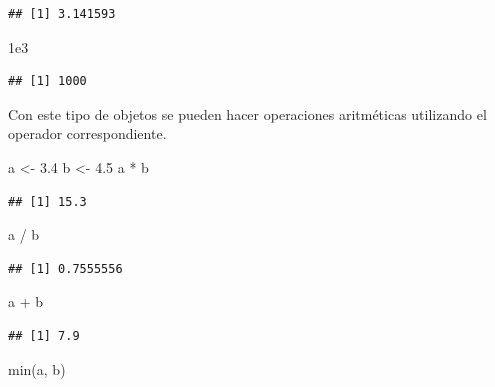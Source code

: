 \documentclass[
]{book}
\newenvironment{Shaded}{\begin{snugshade}}{\end{snugshade}}
\newcommand{\FloatTok}[1]{\textcolor[rgb]{0.00,0.00,0.81}{#1}}
\newcommand{\FunctionTok}[1]{\textcolor[rgb]{0.00,0.00,0.00}{#1}}
\newcommand{\NormalTok}[1]{#1}
\newcommand{\OtherTok}[1]{\textcolor[rgb]{0.56,0.35,0.01}{#1}}
\newcommand{\SpecialCharTok}[1]{\textcolor[rgb]{0.00,0.00,0.00}{#1}}
\theoremstyle{break}
\begin{document}
\begin{verbatim}
## [1] 3.141593
\end{verbatim}

\begin{Shaded}
\begin{Highlighting}[]
\FloatTok{1e3}
\end{Highlighting}
\end{Shaded}

\begin{verbatim}
## [1] 1000
\end{verbatim}

Con este tipo de objetos se pueden hacer operaciones aritméticas
utilizando el operador correspondiente.

\begin{Shaded}
\begin{Highlighting}[]
\NormalTok{a }\OtherTok{\textless{}{-}} \FloatTok{3.4}
\NormalTok{b }\OtherTok{\textless{}{-}} \FloatTok{4.5}
\NormalTok{a }\SpecialCharTok{*}\NormalTok{ b}
\end{Highlighting}
\end{Shaded}

\begin{verbatim}
## [1] 15.3
\end{verbatim}

\begin{Shaded}
\begin{Highlighting}[]
\NormalTok{a }\SpecialCharTok{/}\NormalTok{ b}
\end{Highlighting}
\end{Shaded}

\begin{verbatim}
## [1] 0.7555556
\end{verbatim}

\begin{Shaded}
\begin{Highlighting}[]
\NormalTok{a }\SpecialCharTok{+}\NormalTok{ b}
\end{Highlighting}
\end{Shaded}

\begin{verbatim}
## [1] 7.9
\end{verbatim}

\begin{Shaded}
\begin{Highlighting}[]
\FunctionTok{min}\NormalTok{(a, b)}
\end{Highlighting}
\end{Shaded}
\end{document}
